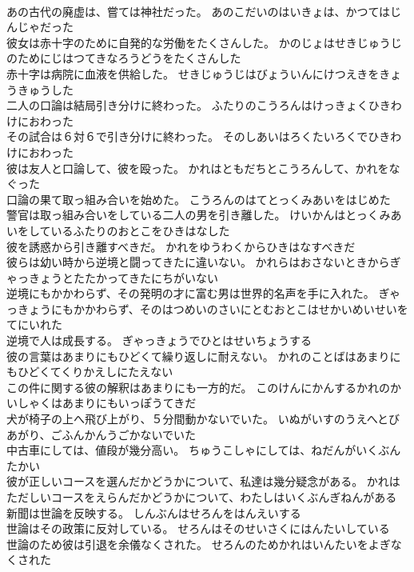 \documentclass[8pt]{extreport}
\begin{document}
\begin{CJK}{UTF8}{min}
\\	あの古代の廃虚は、嘗ては神社だった。	あのこだいのはいきょは、かつてはじんじゃだった 
\\	彼女は赤十字のために自発的な労働をたくさんした。	かのじょはせきじゅうじのためにじはつてきなろうどうをたくさんした 
\\	赤十字は病院に血液を供給した。	せきじゅうじはびょういんにけつえきをきょうきゅうした 
\\	二人の口論は結局引き分けに終わった。	ふたりのこうろんはけっきょくひきわけにおわった 
\\	その試合は６対６で引き分けに終わった。	そのしあいはろくたいろくでひきわけにおわった 
\\	彼は友人と口論して、彼を殴った。	かれはともだちとこうろんして、かれをなぐった 
\\	口論の果て取っ組み合いを始めた。	こうろんのはてとっくみあいをはじめた 
\\	警官は取っ組み合いをしている二人の男を引き離した。	けいかんはとっくみあいをしているふたりのおとこをひきはなした 
\\	彼を誘惑から引き離すべきだ。	かれをゆうわくからひきはなすべきだ 
\\	彼らは幼い時から逆境と闘ってきたに違いない。	かれらはおさないときからぎゃっきょうとたたかってきたにちがいない 
\\	逆境にもかかわらず、その発明の才に富む男は世界的名声を手に入れた。	ぎゃっきょうにもかかわらず、そのはつめいのさいにとむおとこはせかいめいせいをてにいれた 
\\	逆境で人は成長する。	ぎゃっきょうでひとはせいちょうする 
\\	彼の言葉はあまりにもひどくて繰り返しに耐えない。	かれのことばはあまりにもひどくてくりかえしにたえない 
\\	この件に関する彼の解釈はあまりにも一方的だ。	このけんにかんするかれのかいしゃくはあまりにもいっぽうてきだ 
\\	犬が椅子の上へ飛び上がり、５分間動かないでいた。	いぬがいすのうえへとびあがり、ごふんかんうごかないでいた 
\\	中古車にしては、値段が幾分高い。	ちゅうこしゃにしては、ねだんがいくぶんたかい 
\\	彼が正しいコースを選んだかどうかについて、私達は幾分疑念がある。	かれはただしいコースをえらんだかどうかについて、わたしはいくぶんぎねんがある 
\\	新聞は世論を反映する。	しんぶんはせろんをはんえいする 
\\	世論はその政策に反対している。	せろんはそのせいさくにはんたいしている 
\\	世論のため彼は引退を余儀なくされた。	せろんのためかれはいんたいをよぎなくされた 

\end{CJK}
\end{document}
